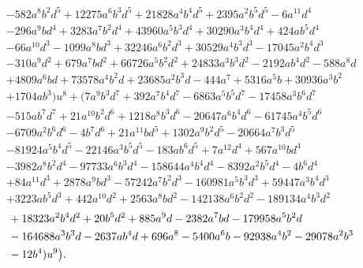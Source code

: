 \documentclass[microtype]{gtpart}     %
\theoremstyle{remark}
\theoremstyle{definition}
\begin{document}
\begin{equation*}
\begin{split}
      & - 582 a^8 b^2 d^5 + 12275 a^6 b^3 d^5 + 21828 a^4 b^4 d^5 + 2395 a^2 b^5 d^5 - 6 a^{11} d^4 \\
      & - 296 a^9 b d^4 + 3283 a^7 b^2 d^4 + 43960 a^5 b^3 d^4 + 30290 a^3 b^4 d^4 + 424 a b^5 d^4 \\
      & - 66 a^{10} d^3 - 1099 a^8 b d^3 + 32246 a^6 b^2 d^3 + 30529 a^4 b^3 d^3 - 17045 a^2 b^4 d^3 \\
      & - 310 a^9 d^2 + 679 a^7 b d^2 + 66726 a^5 b^2 d^2 + 24833 a^3 b^3 d^2 - 2192 a b^4 d^2 - 588 a^8 d \\
      & + 4809 a^6 b d + 73578 a^4 b^2 d + 23685 a^2 b^3 d - 444 a^7 + 5316 a^5 b + 30936 a^3 b^2 \\
      & + 1704 a b^3) u^8 + (7 a^9 b^3 d^7 + 392 a^7 b^4 d^7 - 6863 a^5 b^5 d^7 - 17458 a^3 b^6 d^7 \\
      & - 515 a b^7 d^7 + 21 a^{10} b^2 d^6 + 1218 a^8 b^3 d^6 - 20647 a^6 b^4 d^6 - 61745 a^4 b^5 d^6 \\
      & - 6709 a^2 b^6 d^6 - 4 b^7 d^6 + 21 a^{11} b d^5 + 1302 a^9 b^2 d^5 - 20664 a^7 b^3 d^5 \\
      & - 81924 a^5 b^4 d^5 - 22146 a^3 b^5 d^5 - 183 a b^6 d^5 + 7 a^{12} d^4 + 567 a^{10} b d^4 \\
      & - 3982 a^8 b^2 d^4 - 97733 a^6 b^3 d^4 - 158644 a^4 b^4 d^4 - 8392 a^2 b^5 d^4 - 4 b^6 d^4 \\
      & + 84 a^{11} d^3 + 2878 a^9 b d^3 - 57242 a^7 b^2 d^3 - 160981 a^5 b^3 d^3 + 59447 a^3 b^4 d^3 \\
      & + 3223 a b^5 d^3 + 442 a^{10} d^2 + 2563 a^8 b d^2 - 142138 a^6 b^2 d^2 - 189134 a^4 b^3 d^2 
\end{split}
\end{equation*}
\begin{equation*}
\begin{split}
\qua  & + 18323 a^2 b^4 d^2 + 20 b^5 d^2 + 885 a^9 d - 2382 a^7 b d - 179958 a^5 b^2 d \\
      & - 164688 a^3 b^3 d - 2637 a b^4 d + 696 a^8 - 5400 a^6 b - 92938 a^4 b^2 - 29078 a^2 b^3 \\
      & - 12 b^4) u^9 \big).  
\end{split}
\end{equation*}

%
%
%
\renewcommand{\bibsection}{\section*{} \textbf{\Large References \\} \addcontentsline{toc}{part}{References}}
%

%



\end{document}
